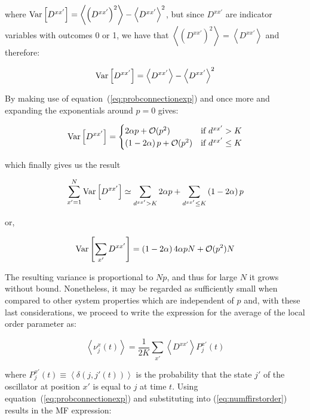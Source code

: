 \noindent where $\text{Var}\left[{D^{xx'}}\right] = \left< \left( D^{xx'} \right)^2 \right> - \left< D^{xx'} \right>^2$, but since $D^{xx'}$ are indicator
variables with outcomes 0 or 1, we have that $\left< \left( D^{xx'} \right)^2 \right> = \left< D^{xx'} \right>$ and therefore:

\begin{equation}
  \text{Var}\left[{D^{xx'}}\right] = \left< D^{xx'} \right> - \left< D^{xx'} \right>^2
\end{equation}

By making use of equation~(\ref{eq:probconnectionexp}) and once more and expanding the exponentials around $p=0$ gives:

\begin{equation}
  \text{Var}\left[{D^{xx'}}\right] =
  \begin{cases}
    2\alpha p + \mathcal{O}(p^2) & \text{if $d^{xx'} > K$} \\
    \left( 1-2\alpha \right)p + \mathcal{O}(p^2) & \text{if $d^{xx'} \leq K$}
  \end{cases}
\end{equation}

\noindent which finally gives us the result

\begin{equation*}
  \sum\limits_{x'=1}^N\text{Var}\left[{D^{xx'}}\right] \simeq \sum_{d^{xx'} > K} 2\alpha p + \sum_{d^{xx'} \leq K} \left( 1-2\alpha \right)p
\end{equation*}

\noindent or,

\begin{equation}
  \text{Var}\left[{\sum_{x'}D^{xx'}}\right] = \left(1-2\alpha\right)4\alpha pN + \mathcal{O}(p^2)N
\end{equation}

The resulting variance is proportional to $Np$, and thus for large $N$ it grows without bound. Nonetheless, it may be regarded as
sufficiently small when compared to other system properties which are independent of $p$ and, with these last considerations, we
proceed to write the expression for the average of the local order parameter as:

\begin{equation}
  \left< \nu^x_j(t) \right> = \frac{1}{2K} \sum_{x'}\left< D^{xx'} \right> P^{x'}_j(t)
  \label{eq:numffirstorder}
\end{equation}

\noindent where $P^{x'}_j(t) \equiv \left< \delta(j,j'(t)) \right>$ is the probability that the state $j'$ of the oscillator at
position $x'$ is equal to $j$ at time $t$.  Using equation~(\ref{eq:probconnectionexp}) and substituting into (\ref{eq:numffirstorder})
results in the MF expression:

